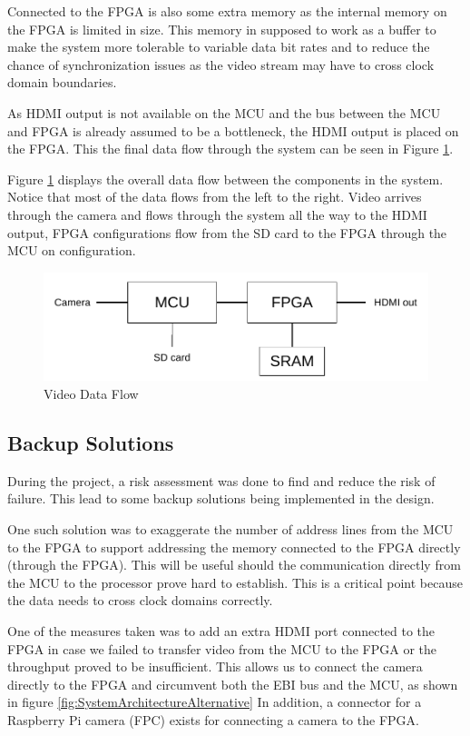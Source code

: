 Connected to the FPGA is also some extra memory as the internal memory on the FPGA is limited in size.
This memory in supposed to work as a buffer to make the system more tolerable to variable data bit rates and to reduce the chance of synchronization issues as the video stream may have to cross clock domain boundaries.

As HDMI output is not available on the MCU and the bus between the MCU and FPGA is already assumed to be a bottleneck, the HDMI output is placed on the FPGA.
This the final data flow through the system can be seen in Figure \ref{fig:SystemArchitecture}.

Figure \ref{fig:SystemArchitecture} displays the overall data flow between the components in the system.
Notice that most of the data flows from the left to the right. Video arrives through the camera and flows through the system all the way to the HDMI output, FPGA configurations flow from the SD card to the FPGA through the MCU on configuration.

\begin{figure}
    \includegraphics{img/SystemArchitecture}
    \caption{Video Data Flow}
    \label{fig:SystemArchitecture}
\end{figure}

\subsection{Backup Solutions} \label{subsec:RiskAssessment}
During the project, a risk assessment was done to find and reduce the risk of failure.
This lead to some backup solutions being implemented in the design.

One such solution was to exaggerate the number of address lines from the MCU to the FPGA to support addressing the memory connected to the FPGA directly (through the FPGA).
This will be useful should the communication directly from the MCU to the processor prove hard to establish.
This is a critical point because the data needs to cross clock domains correctly.

One of the measures taken was to add an extra HDMI port connected to the FPGA in case we failed to transfer video from the MCU to the FPGA or the throughput proved to be insufficient.
This allows us to connect the camera directly to the FPGA and circumvent both the EBI bus and the MCU, as shown in figure \ref{fig:SystemArchitectureAlternative}
In addition, a connector for a Raspberry Pi camera (FPC) exists for connecting a camera to the FPGA.

